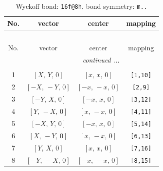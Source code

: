 \documentclass[fleqn,8pt]{jsarticle}
\begin{document}
\begin{longtable}{cccc}
\caption{Wyckoff bond: {\tt 16f@8h}, bond symmetry: {\tt m..}}
 \\
 \hline \hline
No. & vector & center & mapping \\ \hline \endfirsthead

\multicolumn{3}{l}{\tablename\ \thetable{}} \\
 \hline \hline
No. & vector & center & mapping \\ \hline \endhead

 \hline \hline
\multicolumn{3}{r}{\footnotesize\it continued ...} \\ \endfoot

 \hline \hline
\multicolumn{3}{r}{} \\ \endlastfoot

1 & $\left[ X,\, Y,\, 0 \right]$ & $\left[ x,\, x,\, 0 \right]$ & {\tt [1,10]} \\ \hline
2 & $\left[ - X,\, - Y,\, 0 \right]$ & $\left[ - x,\, - x,\, 0 \right]$ & {\tt [2,9]} \\ \hline
3 & $\left[ - Y,\, X,\, 0 \right]$ & $\left[ - x,\, x,\, 0 \right]$ & {\tt [3,12]} \\ \hline
4 & $\left[ Y,\, - X,\, 0 \right]$ & $\left[ x,\, - x,\, 0 \right]$ & {\tt [4,11]} \\ \hline
5 & $\left[ - X,\, Y,\, 0 \right]$ & $\left[ - x,\, x,\, 0 \right]$ & {\tt [5,14]} \\ \hline
6 & $\left[ X,\, - Y,\, 0 \right]$ & $\left[ x,\, - x,\, 0 \right]$ & {\tt [6,13]} \\ \hline
7 & $\left[ Y,\, X,\, 0 \right]$ & $\left[ x,\, x,\, 0 \right]$ & {\tt [7,16]} \\ \hline
8 & $\left[ - Y,\, - X,\, 0 \right]$ & $\left[ - x,\, - x,\, 0 \right]$ & {\tt [8,15]} \\
\end{longtable}
\renewcommand{\arraystretch}{1.2}
\end{document}
